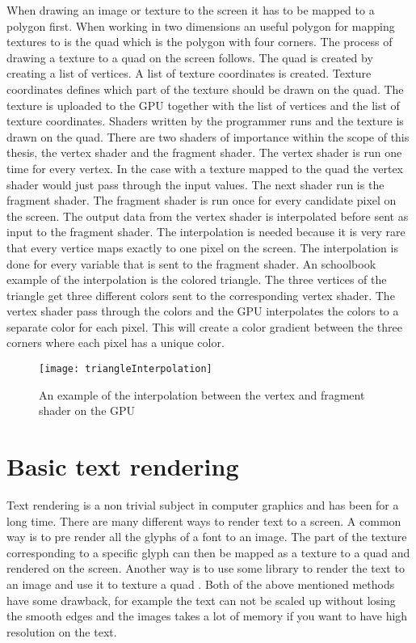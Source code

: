 When drawing an image or texture to the screen it has to be mapped to a polygon first. When working in two dimensions an useful polygon for mapping textures to is the quad which is the polygon with four corners. The process of drawing a texture to a quad on the screen follows. The quad is created by creating a list of vertices. A list of texture coordinates is created. Texture coordinates defines which part of the texture should be drawn on the quad. The texture is uploaded to the GPU together with the list of vertices and the list of texture coordinates. Shaders written by the programmer runs and the texture is drawn on the quad. There are two shaders of importance within the scope of this thesis, the vertex shader and the fragment shader. The vertex shader is run one time for every vertex. In the case with a texture mapped to the quad the vertex shader would just pass through the input values. The next shader run is the fragment shader. The fragment shader is run once for every candidate pixel on the screen. The output data from the vertex shader is interpolated before sent as input to the fragment shader. The interpolation is needed because it is very rare that every vertice maps exactly to one pixel on the screen. The interpolation is done for every variable that is sent to the fragment shader. An schoolbook example of the interpolation is the colored triangle. The three vertices of the triangle get three different colors sent to the corresponding vertex shader. The vertex shader pass through the colors and the GPU interpolates the colors to a separate color for each pixel. This will create a color gradient between the three corners where each pixel has a unique color. 
\begin{figure}[H]
\centerline{\texttt{[image: triangleInterpolation]}}
\caption{An example of the interpolation between the vertex and fragment shader on the GPU}
\end{figure}
\section{Basic text rendering}\label{textrendering}
Text rendering is a non trivial subject in computer graphics and has been for a long time. There are many different ways to render text to a screen. A common way is to pre render all the glyphs of a font to an image. The part of the texture corresponding to a specific glyph can then be mapped as a texture to a quad and rendered on the screen. Another way is to use some library to render the text to an image and use it to texture a quad \citep{FreeType}. Both of the above mentioned methods have some drawback, for example the text can not be scaled up without losing the smooth edges and the images takes a lot of memory if you want to have high resolution on the text.

